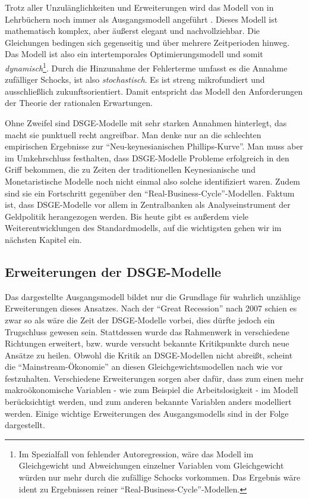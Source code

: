 Trotz aller Unzulänglichkeiten und Erweiterungen wird das Modell von \textcite{Gali2000} in Lehrbüchern noch immer als Ausgangsmodell angeführt \parencite[S. 350]{Romer2019}. Dieses Modell ist mathematisch komplex, aber äußerst elegant und nachvollziehbar. Die Gleichungen bedingen sich gegenseitig und über mehrere Zeitperioden hinweg. Das Modell ist also ein intertemporales Optimierungsmodell und somit \textit{dynamisch}\footnote{Im Spezialfall von fehlender Autoregression, wäre das Modell im Gleichgewicht und Abweichungen einzelner Variablen vom Gleichgewicht würden nur mehr durch die zufällige Schocks vorkommen. Das Ergebnis wäre ident zu Ergebnissen reiner "`Real-Business-Cycle"'-Modellen.}. Durch die Hinzunahme der Fehlerterme umfasst es die Annahme zufälliger Schocks, ist also \textit{stochastisch}. Es ist streng mikrofundiert und ausschließlich zukunftsorientiert. Damit entspricht das Modell den Anforderungen der Theorie der rationalen Erwartungen.

Ohne Zweifel sind DSGE-Modelle mit sehr starken Annahmen hinterlegt, das macht sie punktuell recht angreifbar. Man denke nur an die schlechten empirischen Ergebnisse zur "`Neu-keynesianischen Phillips-Kurve"'. Man muss aber im Umkehrschluss festhalten, dass DSGE-Modelle Probleme erfolgreich in den Griff bekommen, die zu Zeiten der traditionellen Keynesianische und Monetaristische Modelle noch nicht einmal also solche identifiziert waren. Zudem sind sie ein Fortschritt gegenüber den "`Real-Business-Cycle"'-Modellen. Faktum ist, dass DSGE-Modelle vor allem in Zentralbanken als Analyseinstrument der Geldpolitik herangezogen werden. Bis heute gibt es außerdem viele Weiterentwicklungen des Standardmodells, auf die wichtigsten gehen wir im nächsten Kapitel ein.


\subsection{Erweiterungen der DSGE-Modelle}
\label{ErweiterungDSGE}

Das dargestellte Ausgangsmodell bildet nur die Grundlage für wahrlich unzählige Erweiterungen dieses Ansatzes. Nach der "`Great Recession"' nach 2007 schien es zwar so als wäre die Zeit der DSGE-Modelle vorbei, dies dürfte jedoch ein Trugschluss gewesen sein. 
Stattdessen wurde das Rahmenwerk in verschiedene Richtungen erweitert, bzw. wurde versucht bekannte Kritikpunkte durch neue Ansätze zu heilen. Obwohl die Kritik an DSGE-Modellen nicht abreißt, scheint die "`Mainstream-Ökonomie"' an diesen Gleichgewichtsmodellen nach wie vor festzuhalten. Verschiedene Erweiterungen sorgen aber dafür, dass zum einen mehr makroökonomische Variablen - wie zum Beispiel die Arbeitslosigkeit - im Modell berücksichtigt werden, und zum anderen bekannte Variablen anders modelliert werden. Einige wichtige Erweiterungen des Ausgangsmodells sind in der Folge dargestellt.

